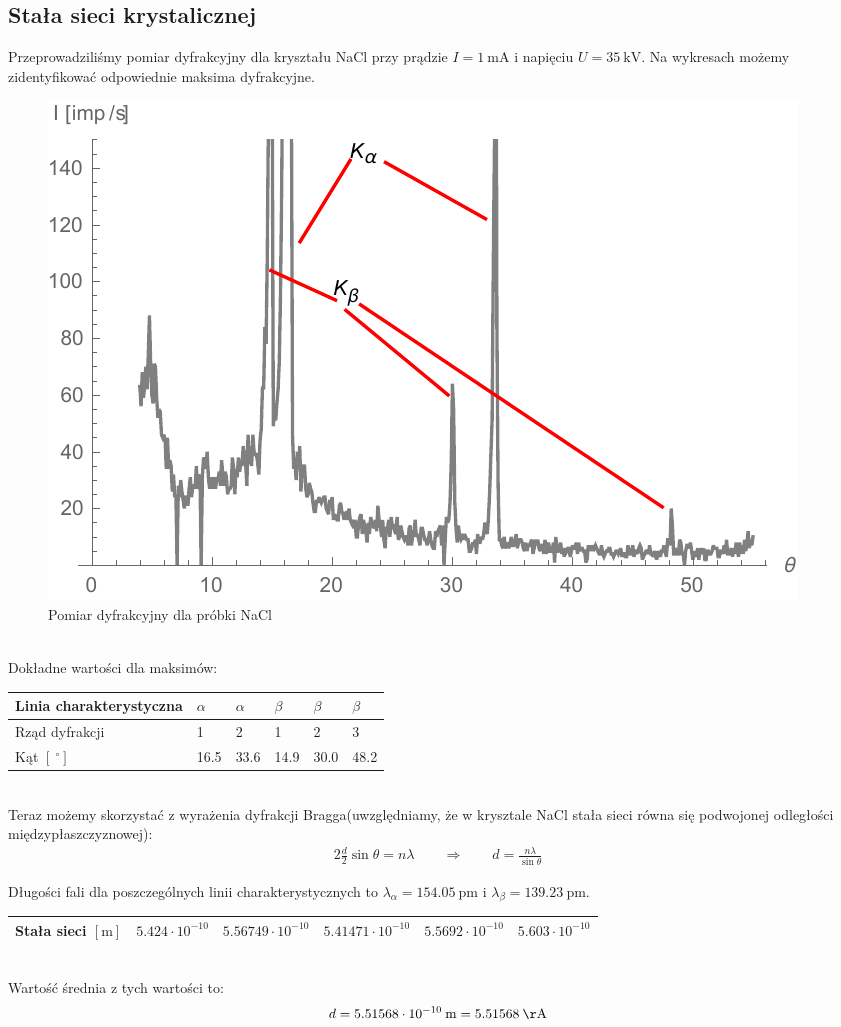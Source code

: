 \documentclass[paper=a4, fontsize=12pt]{scrartcl}
\begin{document}
 \subsection{Stała sieci krystalicznej}
 Przeprowadziliśmy pomiar dyfrakcyjny dla kryształu NaCl przy prądzie $I=1\:\mathrm{mA}$ i napięciu $U=35\:\mathrm{kV}$. Na wykresach możemy zidentyfikować odpowiednie maksima dyfrakcyjne.
 \begin{figure}[h!]
\centering
\includegraphics[width=0.8\linewidth]{nacl}
\caption{Pomiar dyfrakcyjny dla próbki NaCl}
\label{fig:nacl}
\end{figure}\\
Dokładne wartości dla maksimów:
\begin{table}[h!]
	\begin{tabular}{|l|l|l|l|l|l|}
		\hline
		Linia charakterystyczna & $\alpha$ & $\alpha$ & $\beta$ & $\beta$ & $\beta$ \\ \hline
		Rząd dyfrakcji          & 1    & 2    & 1    & 2    & 3    \\ \hline
		Kąt $[\:^\circ]$ & 16.5 & 33.6 & 14.9 & 30.0 & 48.2 \\ \hline
	\end{tabular}
\end{table}\\
Teraz możemy skorzystać z wyrażenia dyfrakcji Bragga(uwzględniamy, że w krysztale NaCl stała sieci równa się podwojonej odległości międzypłaszczyznowej):
\begin{align*}
2\frac{d}{2}\sin\theta=n\lambda\qquad\Rightarrow\qquad d=\frac{n\lambda}{\sin\theta}
\end{align*}

Długości fali dla poszczególnych linii charakterystycznych to $\lambda_\alpha=154.05\:\mathrm{pm}$ i $\lambda_\beta=139.23\:\mathrm{pm}$.
\begin{table}[h]
	\begin{tabular}{|l|l|l|l|l|l|}
		\hline
		Stała sieci $[\mathrm{m}]$ & $5.424\cdot10^{-10}$ & $5.56749\cdot10^{-10}$ & $5.41471\cdot10^{-10}$ & $5.5692\cdot10^{-10}$ & $5.603\cdot10^{-10}$ \\ \hline
	\end{tabular}
\end{table}\\
Wartość średnia z tych wartości to:
\begin{align*}
d=5.51568\cdot10^{-10}\:\mathrm{m}=5.51568\:\mathrm{\AA}
\end{align*}
\end{document}
